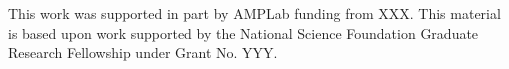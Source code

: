 \documentclass{vldb}
\begin{document}
This work was supported in part by AMPLab funding from XXX.  This
material is based upon work supported by the National Science
Foundation Graduate Research Fellowship under Grant No. YYY.

\balance

\footnotesize


\end{document}
